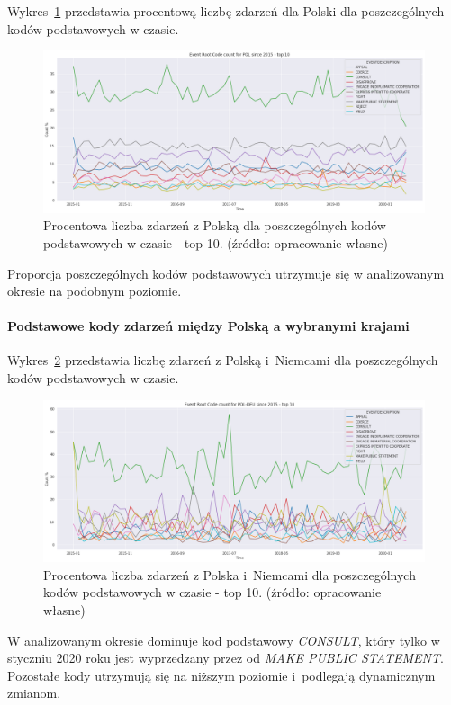 \documentclass[11pt]{report}
\begin{document}
    Wykres~\ref{fig:PLPERCpercinTIME} przedstawia procentową liczbę zdarzeń dla Polski dla poszczególnych kodów podstawowych w czasie.
    \begin{figure}[!htp]
        \centering
        \includegraphics[width=\linewidth]{fig/PL/PLERCpercinTIME.png}
        \caption{Procentowa liczba zdarzeń z Polską dla poszczególnych kodów podstawowych w czasie - top 10. (źródło: opracowanie własne)}
        \label{fig:PLPERCpercinTIME}
    \end{figure}
    Proporcja poszczególnych kodów podstawowych utrzymuje się w analizowanym okresie na podobnym poziomie.

    \paragraph{Podstawowe kody zdarzeń między Polską a wybranymi krajami}

    Wykres~\ref{fig:PLDEUERC} przedstawia liczbę zdarzeń z Polską i~Niemcami dla poszczególnych kodów podstawowych w czasie.
    \begin{figure}[!htp]
        \centering
        \includegraphics[width=\linewidth]{fig/PL/POLDEUERCperc.png}
        \caption{Procentowa liczba zdarzeń z Polska i~Niemcami dla poszczególnych kodów podstawowych w czasie - top 10. (źródło: opracowanie własne)}
        \label{fig:PLDEUERC}
    \end{figure}
    W analizowanym okresie dominuje kod podstawowy \textit{CONSULT}, który tylko w styczniu 2020 roku jest wyprzedzany przez od \textit{MAKE PUBLIC STATEMENT}.
    Pozostałe kody utrzymują się na niższym poziomie i~podlegają dynamicznym zmianom.
\end{document}
